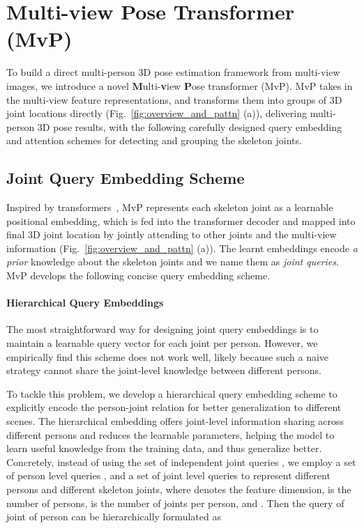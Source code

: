 \documentclass{article}
\begin{document}
\section{Multi-view Pose Transformer (MvP)}


To build a direct multi-person 3D pose estimation framework from multi-view images, we introduce a novel \textbf{M}ulti-\textbf{v}iew \textbf{P}ose transformer (MvP). MvP takes in the multi-view feature representations, and transforms them into groups of 3D joint locations directly (Fig.~\ref{fig:overview_and_pattn} (a)), delivering multi-person 3D pose results, with the following carefully designed query embedding and attention schemes for detecting and grouping the skeleton joints.


\subsection{Joint Query Embedding Scheme}
\label{sec:joint_query}

Inspired by transformers~\cite{vaswani2017attention}, MvP represents each skeleton joint as a learnable positional embedding, which is fed into the transformer decoder and mapped into final 3D joint location by jointly attending to other joints and the multi-view information (Fig.~\ref{fig:overview_and_pattn} (a)).
The learnt embeddings encode \emph{a prior} knowledge about the skeleton joints and we name them as \emph{joint queries}. MvP develops the following concise query embedding scheme. 

\paragraph{Hierarchical Query Embeddings}

The most straightforward way for designing joint query embeddings is to maintain a learnable query vector for each joint per person. However, we empirically find this scheme does not work well, likely because such a naive strategy cannot share the joint-level knowledge between different persons.

To tackle this problem, we develop a hierarchical query embedding scheme to explicitly encode the person-joint relation for better generalization to different scenes. 
The hierarchical embedding offers joint-level information sharing across different persons 
and reduces the learnable parameters, helping the model to learn useful knowledge from the training data, and thus generalize better.
Concretely, instead of using the set of independent joint queries , we employ a set of person level queries , and a set of joint level queries  to represent different persons and different skeleton joints, where  denotes the feature dimension,  is the number of persons,   is the number of joints per person, and .
Then the query of joint  of person  can be hierarchically formulated as
\end{document}
